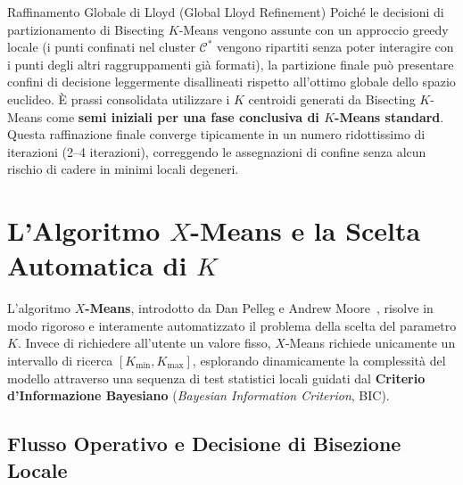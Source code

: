 \begin{noteblock}{Raffinamento Globale di Lloyd (Global Lloyd Refinement)}
Poiché le decisioni di partizionamento di Bisecting $K$-Means vengono assunte con un approccio greedy locale (i punti confinati nel cluster $\mathcal{C}^*$ vengono ripartiti senza poter interagire con i punti degli altri raggruppamenti già formati), la partizione finale può presentare confini di decisione leggermente disallineati rispetto all'ottimo globale dello spazio euclideo. È prassi consolidata utilizzare i $K$ centroidi generati da Bisecting $K$-Means come \textbf{semi iniziali per una fase conclusiva di $K$-Means standard}. Questa raffinazione finale converge tipicamente in un numero ridottissimo di iterazioni (2--4 iterazioni), correggendo le assegnazioni di confine senza alcun rischio di cadere in minimi locali degeneri.
\end{noteblock}

\FloatBarrier
\section{L'Algoritmo \texorpdfstring{$X$}{X}-Means e la Scelta Automatica di \texorpdfstring{$K$}{K}}
\label{sec:dm-xmeans-algorithm}

L'algoritmo \textbf{$X$-Means}, introdotto da Dan Pelleg e Andrew Moore~\cite{pelleg2000}, risolve in modo rigoroso e interamente automatizzato il problema della scelta del parametro $K$. Invece di richiedere all'utente un valore fisso, $X$-Means richiede unicamente un intervallo di ricerca $[K_{\min}, K_{\max}]$, esplorando dinamicamente la complessità del modello attraverso una sequenza di test statistici locali guidati dal \textbf{Criterio d'Informazione Bayesiano} (\textit{Bayesian Information Criterion}, BIC).

\FloatBarrier
\subsection{Flusso Operativo e Decisione di Bisezione Locale}

